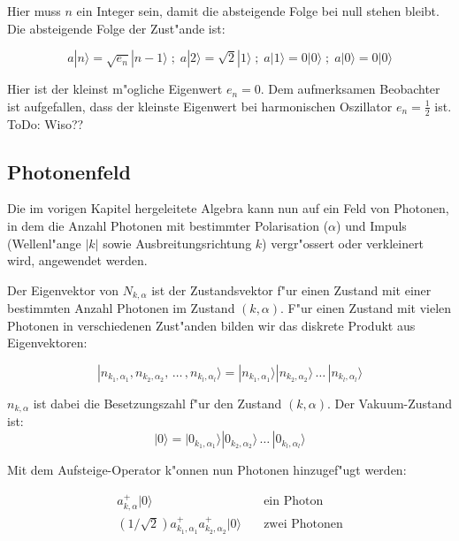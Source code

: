 Hier muss $n$ ein Integer sein, damit die absteigende Folge bei null stehen bleibt. Die absteigende Folge der Zust"ande ist:

\begin{equation}
a|n\rangle = \sqrt{e_n}|n-1\rangle \; ; \; a|2\rangle = \sqrt{2}|1\rangle \; ; \; a|1\rangle = 0|0\rangle \; ; \; a|0\rangle = 0|0\rangle
\end{equation}

Hier ist der kleinst m"ogliche Eigenwert $e_n = 0$. Dem aufmerksamen Beobachter ist aufgefallen, dass der kleinste Eigenwert bei harmonischen Oszillator $e_n = \frac{1}{2}$ ist. ToDo: Wiso??

\subsection{Photonenfeld}

Die im vorigen Kapitel hergeleitete Algebra kann nun auf ein Feld von Photonen, in dem die Anzahl Photonen mit bestimmter Polarisation ($\alpha$) und Impuls (Wellenl"ange $|k|$ sowie Ausbreitungsrichtung $k$) vergr"ossert oder verkleinert wird, angewendet werden.

Der Eigenvektor von $N_{k,\alpha}$ ist der Zustandsvektor f"ur einen Zustand mit einer bestimmten Anzahl Photonen im Zustand $(k,\alpha)$. F"ur einen Zustand mit vielen Photonen in verschiedenen Zust"anden bilden wir das diskrete Produkt aus Eigenvektoren:

\begin{equation}
|n_{k_1,\alpha_1}, n_{k_2,\alpha_2}, \, \hdots \, , n_{k_l,\alpha_l}\rangle = |n_{k_1,\alpha_1}\rangle |n_{k_2,\alpha_2}\rangle \, \hdots \, |n_{k_l,\alpha_l}\rangle
\end{equation}

$n_{k,\alpha}$ ist dabei die Besetzungszahl f"ur den Zustand $(k,\alpha)$. Der Vakuum-Zustand ist:
\begin{equation}
|0\rangle = |0_{k_1,\alpha_1}\rangle |0_{k_2,\alpha_2}\rangle \, \hdots \, |0_{k_l,\alpha_l}\rangle
\end{equation}

Mit dem Aufsteige-Operator k"onnen nun Photonen hinzugef"ugt werden:

\begin{equation}
\begin{split}
a^+_{k,\alpha}|0\rangle & \quad \text{ein Photon}\\
(1/\sqrt{2})a^+_{k_1,\alpha_1}a^+_{k_2,\alpha_2}|0\rangle & \quad \text{zwei Photonen}\\
\end{split}
\end{equation}


